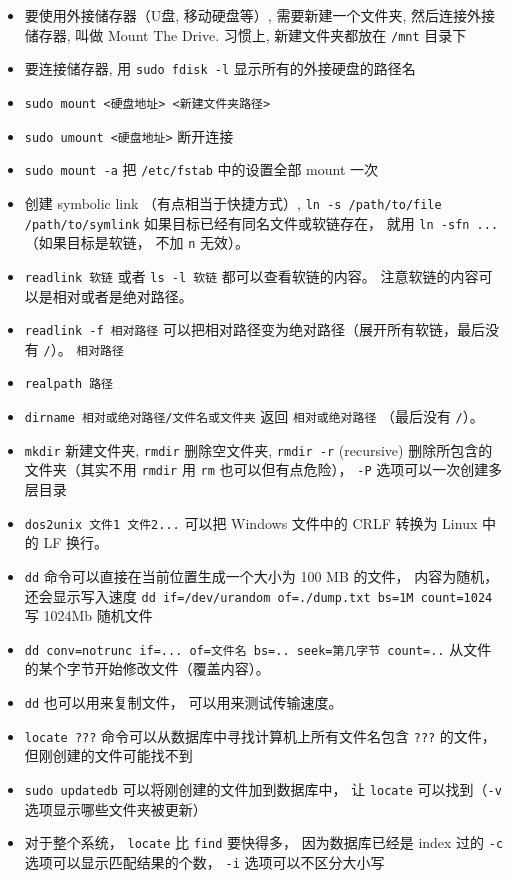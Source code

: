 \begin{itemize}
\item 要使用外接储存器（U盘, 移动硬盘等）, 需要新建一个文件夹, 然后连接外接储存器, 叫做 Mount The Drive. 习惯上, 新建文件夹都放在 \verb`/mnt` 目录下
\item 要连接储存器, 用 \verb`sudo fdisk -l` 显示所有的外接硬盘的路径名
\item \verb`sudo mount <硬盘地址> <新建文件夹路径>`
\item \verb`sudo umount <硬盘地址>` 断开连接
\item \verb`sudo mount -a` 把 \verb|/etc/fstab| 中的设置全部 mount 一次
\item 创建 symbolic link （有点相当于快捷方式）, \verb`ln -s /path/to/file /path/to/symlink` 如果目标已经有同名文件或软链存在， 就用 \verb|ln -sfn ...| （如果目标是软链， 不加 \verb|n| 无效）。
\item \verb|readlink 软链| 或者 \verb|ls -l 软链| 都可以查看软链的内容。 注意软链的内容可以是相对或者是绝对路径。
\item \verb|readlink -f 相对路径| 可以把相对路径变为绝对路径（展开所有软链，最后没有 \verb|/|）。 \verb|相对路径|
\item \verb|realpath 路径|
\item \verb|dirname 相对或绝对路径/文件名或文件夹| 返回 \verb|相对或绝对路径| （最后没有 \verb|/|）。
\item \verb`mkdir` 新建文件夹, \verb`rmdir` 删除空文件夹, \verb`rmdir -r` (recursive) 删除所包含的文件夹（其实不用 \verb`rmdir` 用 \verb`rm` 也可以但有点危险）， \verb`-P` 选项可以一次创建多层目录
\item \verb|dos2unix 文件1 文件2...| 可以把 Windows 文件中的 CRLF 转换为 Linux 中的 LF 换行。 
\item \verb`dd` 命令可以直接在当前位置生成一个大小为 100 MB 的文件， 内容为随机， 还会显示写入速度
\verb`dd if=/dev/urandom of=./dump.txt bs=1M count=1024` 写 1024Mb 随机文件
\item \verb|dd conv=notrunc if=... of=文件名 bs=.. seek=第几字节 count=..|  从文件的某个字节开始修改文件（覆盖内容）。
\item \verb|dd| 也可以用来复制文件， 可以用来测试传输速度。
\item \verb`locate ???` 命令可以从数据库中寻找计算机上所有文件名包含 \verb`???` 的文件， 但刚创建的文件可能找不到
\item \verb`sudo updatedb` 可以将刚创建的文件加到数据库中， 让 \verb`locate` 可以找到（\verb|-v| 选项显示哪些文件夹被更新）
\item 对于整个系统， \verb`locate` 比 \verb`find` 要快得多， 因为数据库已经是 index 过的 \verb`-c` 选项可以显示匹配结果的个数， \verb`-i` 选项可以不区分大小写

\end{itemize}

